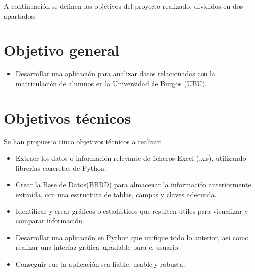 
A continuación se definen los objetivos del proyecto realizado, divididos en dos apartados:


\section{Objetivo general}\label{objetivo-general}

\begin{itemize}

\item
  Desarrollar una aplicación para analizar datos relacionados con la matriculación de alumnos en la Universidad de Burgos (UBU).
  
\end{itemize}


\section{Objetivos técnicos}\label{objetivos-tecnicos}
Se han propuesto cinco objetivos técnicos a realizar:

\begin{itemize}
\item
  Extraer los datos o información relevante de ficheros Excel (.xls), utilizando librerías concretas de Python.
\item
  Crear la Base de Datos(BBDD) para almacenar la información anteriormente extraída, con una estructura de tablas, campos y claves adecuada. 
\item
  Identificar y crear gráficos o estadísticos que resulten útiles para visualizar y comparar información.
\item
  Desarrollar una aplicación en Python que unifique todo lo anterior, así como realizar una interfaz gráfica agradable para el usuario.
\item
  Conseguir que la aplicación sea fiable, usable y robusta.
\end{itemize} 


